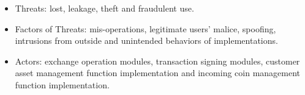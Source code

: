\begin{itemize}
 \item Threats: lost, leakage, theft and fraudulent use.
 \item Factors of Threats: mis-operations, legitimate users' malice, spoofing, intrusions from outside and unintended behaviors of implementations.
 \item Actors: exchange operation modules, transaction signing modules, customer asset management function implementation and incoming coin management function implementation.
\end{itemize}

%


